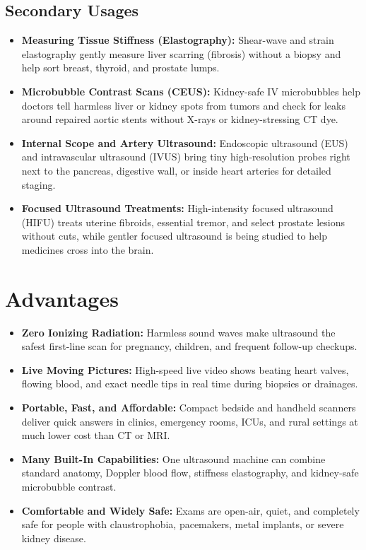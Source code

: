 \subsection{Secondary Usages}
\begin{itemize}
  \item \textbf{Measuring Tissue Stiffness (Elastography):} Shear-wave and strain elastography gently measure liver scarring (fibrosis) without a biopsy and help sort breast, thyroid, and prostate lumps.
  \item \textbf{Microbubble Contrast Scans (CEUS):} Kidney-safe IV microbubbles help doctors tell harmless liver or kidney spots from tumors and check for leaks around repaired aortic stents without X-rays or kidney-stressing CT dye.
  \item \textbf{Internal Scope and Artery Ultrasound:} Endoscopic ultrasound (EUS) and intravascular ultrasound (IVUS) bring tiny high-resolution probes right next to the pancreas, digestive wall, or inside heart arteries for detailed staging.
  \item \textbf{Focused Ultrasound Treatments:} High-intensity focused ultrasound (HIFU) treats uterine fibroids, essential tremor, and select prostate lesions without cuts, while gentler focused ultrasound is being studied to help medicines cross into the brain.
\end{itemize}

\section{Advantages}
\begin{itemize}
  \item \textbf{Zero Ionizing Radiation:} Harmless sound waves make ultrasound the safest first-line scan for pregnancy, children, and frequent follow-up checkups.
  \item \textbf{Live Moving Pictures:} High-speed live video shows beating heart valves, flowing blood, and exact needle tips in real time during biopsies or drainages.
  \item \textbf{Portable, Fast, and Affordable:} Compact bedside and handheld scanners deliver quick answers in clinics, emergency rooms, ICUs, and rural settings at much lower cost than CT or MRI.
  \item \textbf{Many Built-In Capabilities:} One ultrasound machine can combine standard anatomy, Doppler blood flow, stiffness elastography, and kidney-safe microbubble contrast.
  \item \textbf{Comfortable and Widely Safe:} Exams are open-air, quiet, and completely safe for people with claustrophobia, pacemakers, metal implants, or severe kidney disease.
\end{itemize}

